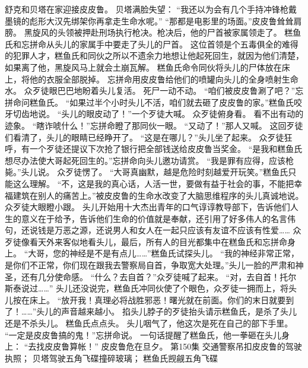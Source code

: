 \documentclass[a4paper,12pt,UTF8,twoside]{ctexbook}
\begin{document}
        舒克和贝塔在家迎接皮皮鲁。 
        贝塔满脸失望： 
        “我还以为会有几个手持冲锋枪戴墨镜的彪形大汉先绑架你再拿走生命水呢。” 
        “那都是电影里的场面。”皮皮鲁耸耸肩膀。 
        黑旋风的头领被押赴刑场执行枪决。枪决后，他的尸首被家属领走了。 
        糕鱼氏和忘拼命从头儿的家属手中要走了头儿的尸首。 
        这位首领是个五毒俱全的难得的犯罪人才，糕鱼氏和同伙之所以不遗余力地想让他起死回生，就因为他们清楚，如果离了他，黑旋风马上就会土崩瓦解。 
        糕鱼氏命令同伙将头儿的尸体放在床上，将他的衣服全部脱掉。 
        忘拼命用皮皮鲁给他们的喷罐向头儿的全身喷射生命水。 
        众歹徒眼巴巴地盼着头儿复活。 
        死尸一动不动。 
        “咱们被皮皮鲁涮了吧？”忘拼命问糕鱼氏。 
        “如果过半个小时头儿不活，咱们就去砸了皮皮鲁的家。”糕鱼氏咬牙切齿地说。 
        “头儿的眼皮动了！”一个歹徒大喊。 
        众歹徒俯身看。 
        看不出有动的迹象。 
        “瞎诈唬什么！”忘拼命瞪了那同伙一眼。 
        “又动了！”那人又喊。 
        这回歹徒们看清了，头儿的眼睛已经睁开了。 
        “这是在哪儿？”头儿坐了起来。 
        众歹徒狂呼，有一个歹徒还提议下次抢了银行把全部钱送给皮皮鲁当奖金。 
        “是我和糕鱼氏想尽办法使大哥起死回生的。”忘拼命向头儿邀功请赏。 
        “我是罪有应得，应该枪毙。”头儿说。 
        众歹徒愣了。 
        “大哥真幽默，越是危险时刻越爱开玩笑。”糕鱼氏只能这么理解。 
        “不，这是我的真心话，人活一世，要做有益于社会的事，不能把幸福建筑在别人的痛苦上。”被皮皮鲁的生命水改变了大脑思维程序的头儿真诚地说。 
        众歹徒大眼瞪小跟。 
        头儿开始用十大杰出青年的口气谆谆教导部下，告诉他们人生的意义在于给予，告诉他们生命的价值就是奉献，还引用了好多伟人的名言伟句，还说钱是万恶之源，还说男人和女人在一起只应该有友谊不应该有性爱…… 
        众歹徒像看天外来客似地看头儿，最后，所有人的目光都集中在糕鱼氏和忘拼命身上。 
        “大哥，您的神经是不是有点儿……”糕鱼氏试探头儿。 
        “我的神经非常正常，是你们不正常，你们现在跟我去警察局自首，争取宽大处理。”头儿一脸的严肃和神圣，还有几分使命感。 
        “什么？去自首？”众歹徒喊了起来。 
        “对，去自首！托尔斯泰说过……” 
        头儿还没说完，糕鱼氏冲同伙使了个眼色，众歹徒一拥而上，将头儿按在床上。 
        “放开我！真理必将战胜邪恶！曙光就在前面。你们的末日就要到了！……”头儿的声音越来越小。 
        掐头儿脖子的歹徒抬头请示糕鱼氏，是杀了头儿还是不杀头儿。 
        糕鱼氏点点头。 
        头儿咽气了，他这次是死在自己的部下手里。 
        “一定是皮皮鲁搞的鬼！”忘拼命说。 
        一句话提醒了糕鱼氏，他一拳砸在头儿身上： 
        “去找皮皮鲁算帐！” 
        皮皮鲁危在旦夕。   第150集 
        交通警察吊扣皮皮鲁的驾驶执照； 
        贝塔驾驶五角飞碟撞碎玻璃； 
        糕鱼氏觊觎五角飞碟   
\end{document}
